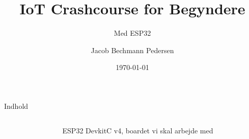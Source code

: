 \documentclass[aspectratio=169]{beamer}
\title{IoT Crashcourse for Begyndere}
\subtitle{Med ESP32}
\author{Jacob Bechmann Pedersen}
\institute{Bechmann Engineering ApS}
\date{\today}
\begin{document}
\begin{frame}
	\titlepage
\end{frame}

\begin{frame}{Indhold}
	\begin{columns}
	\begin{column}{0.6\textwidth}
		\begin{fitBox}
			\tableofcontents{}
		\end{fitBox}
	\end{column}
	\begin{column}{0.4\textwidth}
		\centering
		\begin{figure}
  			
  			\caption{ESP32 DevkitC v4, boardet vi skal arbejde med}
  			\label{fig:esp32}
		\end{figure}
	\end{column}
	\end{columns}	
\end{frame}
\end{document}
